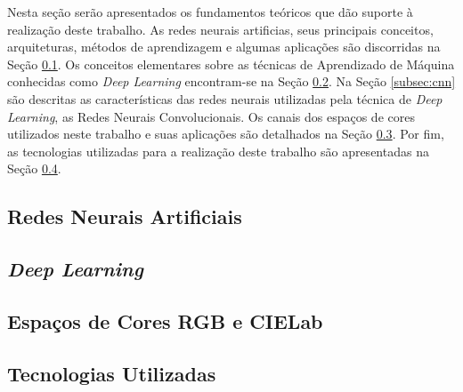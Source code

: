 Nesta seção serão apresentados os fundamentos teóricos que dão suporte à realização deste trabalho. As redes neurais artificias, seus principais conceitos, arquiteturas, métodos de aprendizagem e algumas aplicações são discorridas na Seção \ref{subsec:rna}. Os conceitos elementares sobre as técnicas de Aprendizado de Máquina conhecidas como \textit{Deep Learning} encontram-se na Seção \ref{subsec:deep}. Na Seção \ref{subsec:cnn} são descritas as características das redes neurais utilizadas pela técnica de \textit{Deep Learning}, as Redes Neurais Convolucionais. Os canais dos espaços de cores utilizados neste trabalho e suas aplicações são detalhados na Seção \ref{subsec:cores}.  Por fim, as tecnologias utilizadas para a realização deste trabalho são apresentadas na Seção \ref{subsec:tecnologias}.

\subsection{Redes Neurais Artificiais} \label{subsec:rna}


\subsection{\textit{Deep Learning}} \label{subsec:deep}


\subsection{Espaços de Cores RGB e CIELab} \label{subsec:cores}


\subsection{Tecnologias Utilizadas} \label{subsec:tecnologias}

